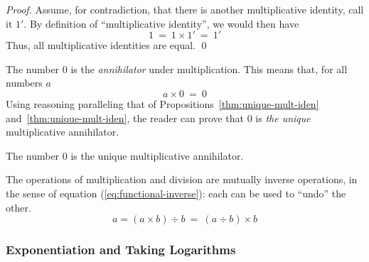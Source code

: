 \begin{proof}
Assume, for contradiction, that there is another multiplicative
identity, call it $1'$.  By definition of ``multiplicative identity'',
we would then have
\[ 1 \ = \ 1 \times 1' \ = \ 1' \]
Thus, all multiplicative identities are equal.  \qed
\end{proof}

\medskip

%
The number $0$ is the {\it annihilator} under
multiplication. This means that, for
all numbers $a$
\[ a \times 0 \ = \ 0 \]
Using reasoning paralleling that of
Propositions~\ref{thm:unique-mult-iden}
and~\ref{thm:unique-mult-iden}, the reader can prove that $0$ is {\em
  the unique} multiplicative annihilator.

\begin{prop}
The number $0$ is the unique multiplicative annihilator.
\end{prop}

\medskip

The operations of multiplication and division are mutually inverse
operations,
in the sense of equation (\ref{eq:functional-inverse}): each can be
used to ``undo'' the other.
\[ a = (a \times b) \div b \ = \ (a \div b) \times b  \]

\subsubsection{Exponentiation and Taking Logarithms}
\label{sec:exponentiation}


